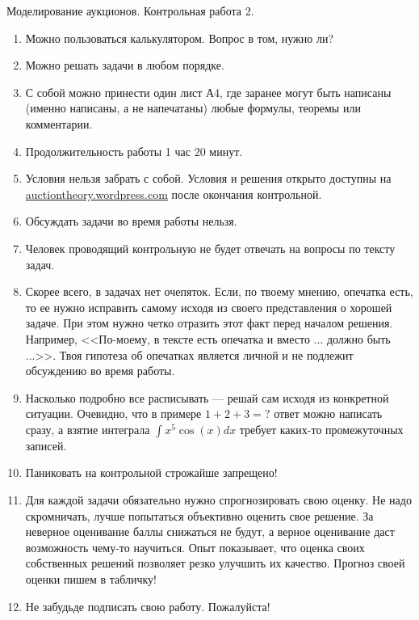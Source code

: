 \documentclass[pdftex,12pt,a4paper]{article}
\begin{document}


\begin{Large}
Моделирование аукционов. Контрольная работа 2.
\end{Large}

\begin{enumerate}
\item Можно пользоваться калькулятором. Вопрос в том, нужно ли?
\item Можно решать задачи в любом порядке.
\item С собой можно принести один лист А4, где заранее могут быть написаны (именно написаны, а не напечатаны) любые формулы, теоремы или комментарии.
\item Продолжительность работы 1 час 20 минут.
\item Условия нельзя забрать с собой. Условия и решения открыто доступны на \url{auctiontheory.wordpress.com} после окончания контрольной.
\item Обсуждать задачи во время работы нельзя.
\item Человек проводящий контрольную не будет отвечать на вопросы по тексту задач. 
\item Скорее всего, в задачах нет очепяток. Если, по твоему мнению, опечатка есть, то ее нужно исправить самому исходя из своего представления о хорошей задаче. При этом нужно четко отразить этот факт перед началом решения. Например, <<По-моему, в тексте есть опечатка и вместо ... должно быть ...>>. Твоя гипотеза об опечатках является личной и не подлежит обсуждению во время работы.
\item Насколько подробно все расписывать --- решай сам исходя из конкретной ситуации. Очевидно, что в примере $ 1+2+3=? $ ответ можно написать сразу, а взятие интеграла $ \int x^{5}\cos(x)dx $ требует каких-то промежуточных записей.
\item Паниковать на контрольной строжайше запрещено!
\item Для каждой задачи обязательно нужно спрогнозировать свою оценку. Не надо скромничать, лучше попытаться объективно оценить свое решение.  За неверное оценивание баллы снижаться не будут, а верное оценивание даст возможность чему-то научиться. Опыт показывает, что оценка своих собственных решений позволяет резко улучшить их качество. Прогноз своей оценки пишем в табличку!
\item Не забудьде подписать свою работу. Пожалуйста!

\end{enumerate}
\end{document}
